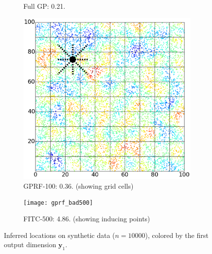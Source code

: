 \documentclass{article}
\renewcommand{\v}[1]{\mathbf{#1}}
\begin{document}
\begin{figure}
\begin{subfigure}[t]{.21\textwidth}
        \caption{Full GP: 0.21.}
        \label{fig:synth_exact} 
    \end{subfigure}\hspace{0.5em}
\begin{subfigure}[t]{.22\textwidth}
        \includegraphics[width=\textwidth]{synth_grid_edges}
        \caption{GPRF-100: 0.36. (showing grid cells)}
        \label{fig:synth_gprf} 
    \end{subfigure}\hspace{0.5em}
\begin{subfigure}[t]{.21\textwidth}
        \centering
        \texttt{[image: gprf\_bad500]}
        \caption{FITC-500: 4.86. (showing inducing points)}
        \label{fig:synth_fitc500} 
\end{subfigure}
\caption{Inferred locations on synthetic data
  ($n=10000$), colored by the first output dimension $\v{y}_1$. }
\label{fig:synth_data}
\vspace{-.3cm}
\end{figure}

\end{document}
